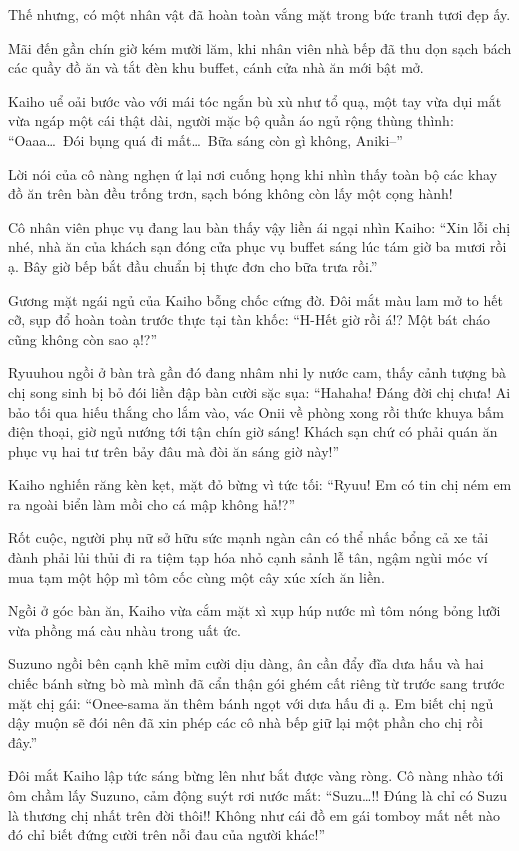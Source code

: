 \documentclass[../main.tex]{subfiles}
\begin{document}
Thế nhưng, có một nhân vật đã hoàn toàn vắng mặt trong bức tranh tươi đẹp ấy.

Mãi đến gần chín giờ kém mười lăm, khi nhân viên nhà bếp đã thu dọn sạch bách các quầy đồ ăn và tắt đèn khu buffet, cánh cửa nhà ăn mới bật mở.

Kaiho uể oải bước vào với mái tóc ngắn bù xù như tổ quạ, một tay vừa dụi mắt vừa ngáp một cái thật dài, người mặc bộ quần áo ngủ rộng thùng thình: ``Oaaa\dots\ Đói bụng quá đi mất\dots\ Bữa sáng còn gì không, Aniki--''

Lời nói của cô nàng nghẹn ứ lại nơi cuống họng khi nhìn thấy toàn bộ các khay đồ ăn trên bàn đều trống trơn, sạch bóng không còn lấy một cọng hành!

Cô nhân viên phục vụ đang lau bàn thấy vậy liền ái ngại nhìn Kaiho: ``Xin lỗi chị nhé, nhà ăn của khách sạn đóng cửa phục vụ buffet sáng lúc tám giờ ba mươi rồi ạ. Bây giờ bếp bắt đầu chuẩn bị thực đơn cho bữa trưa rồi.''

Gương mặt ngái ngủ của Kaiho bỗng chốc cứng đờ. Đôi mắt màu lam mở to hết cỡ, sụp đổ hoàn toàn trước thực tại tàn khốc: ``H-Hết giờ rồi á!? Một bát cháo cũng không còn sao ạ!?''

Ryuuhou ngồi ở bàn trà gần đó đang nhâm nhi ly nước cam, thấy cảnh tượng bà chị song sinh bị bỏ đói liền đập bàn cười sặc sụa: ``Hahaha! Đáng đời chị chưa! Ai bảo tối qua hiếu thắng cho lắm vào, vác Onii về phòng xong rồi thức khuya bấm điện thoại, giờ ngủ nướng tới tận chín giờ sáng! Khách sạn chứ có phải quán ăn phục vụ hai tư trên bảy đâu mà đòi ăn sáng giờ này!''

Kaiho nghiến răng kèn kẹt, mặt đỏ bừng vì tức tối: ``Ryuu! Em có tin chị ném em ra ngoài biển làm mồi cho cá mập không hả!?''

Rốt cuộc, người phụ nữ sở hữu sức mạnh ngàn cân có thể nhấc bổng cả xe tải đành phải lủi thủi đi ra tiệm tạp hóa nhỏ cạnh sảnh lễ tân, ngậm ngùi móc ví mua tạm một hộp mì tôm cốc cùng một cây xúc xích ăn liền.

Ngồi ở góc bàn ăn, Kaiho vừa cắm mặt xì xụp húp nước mì tôm nóng bỏng lưỡi vừa phồng má càu nhàu trong uất ức.

Suzuno ngồi bên cạnh khẽ mỉm cười dịu dàng, ân cần đẩy đĩa dưa hấu và hai chiếc bánh sừng bò mà mình đã cẩn thận gói ghém cất riêng từ trước sang trước mặt chị gái: ``Onee-sama ăn thêm bánh ngọt với dưa hấu đi ạ. Em biết chị ngủ dậy muộn sẽ đói nên đã xin phép các cô nhà bếp giữ lại một phần cho chị rồi đây.''

Đôi mắt Kaiho lập tức sáng bừng lên như bắt được vàng ròng. Cô nàng nhào tới ôm chầm lấy Suzuno, cảm động suýt rơi nước mắt: ``Suzu\dots!! Đúng là chỉ có Suzu là thương chị nhất trên đời thôi!! Không như cái đồ em gái tomboy mất nết nào đó chỉ biết đứng cười trên nỗi đau của người khác!''
\end{document}
